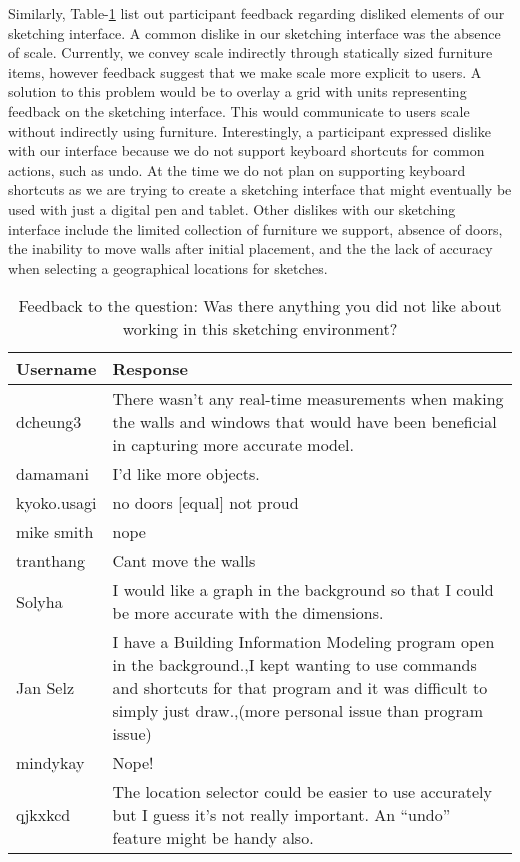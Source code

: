 Similarly, Table-\ref{fig:dislike} list out participant feedback regarding disliked elements of our sketching interface.  A common dislike in our sketching interface was the absence of scale.  Currently, we convey scale indirectly through statically sized furniture items, however feedback suggest that we make scale more explicit to users.  A solution to this problem would be to overlay a grid with units representing feedback on the sketching interface. This would communicate to users scale without indirectly using furniture.  Interestingly, a participant expressed dislike with our interface because we do not support keyboard shortcuts for common actions, such as undo.  At the time we do not plan on supporting keyboard shortcuts as we are trying to create a sketching interface that might eventually be used with just a digital pen and tablet.  Other dislikes with our sketching interface include the limited collection of furniture we support, absence of doors, the inability to move walls after initial placement, and the the lack of accuracy when selecting a geographical locations for sketches.  \\

\begin{table}[!ht]
\centering
\caption[Was there anything you did not like about working in this sketching environment?]{Feedback to the question: Was there anything you did not like about working in this sketching environment?}
\label{fig:dislike}
\begin{tabular}{|p{}|p{}|}
\hline
\rowcolor[HTML]{EFEFEF} 
\textbf{Username} & \textbf{Response} \\ \hline
dcheung3 & There wasn't any real-time measurements when making the walls and windows that would have been beneficial in capturing more accurate model. \\ \hline
damamani & I'd like more objects. \\ \hline
kyoko.usagi & no doors {[}equal{]} not proud \\ \hline
mike smith & nope \\ \hline
tranthang & Cant move the walls \\ \hline
Solyha & I would like a graph in the background so that I could be more accurate with the dimensions. \\ \hline
Jan Selz & I have a Building Information Modeling program open in the background.,I kept wanting to use commands and shortcuts for that program and it was difficult to simply just draw.,(more personal issue than program issue) \\ \hline
mindykay & Nope! \\ \hline
qjkxkcd & The location selector could be easier to use accurately but I guess it's not really important. An ``undo'' feature might be handy also. \\ \hline
\end{tabular}
\end{table}



